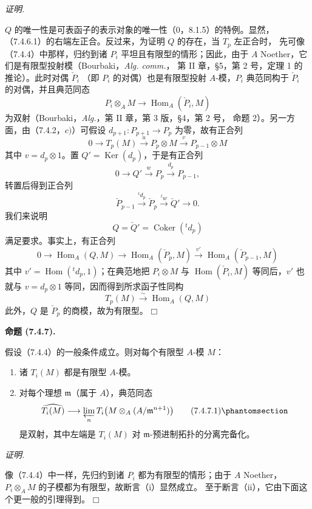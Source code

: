 \documentclass[UTF8,fontset=none,11pt,oneside,openany]{ctexbook}
\providecommand{\square}{\mdlgwhtsquare}
\newenvironment{proposition}[1][]{%
  \par\medskip\noindent\textbf{命题 (#1).}\ %
}{\par}
\newenvironment{proof}{%
  \par\smallskip\noindent\textit{证明.}\ %
}{\hfill$\square$\par}
\newcommand{\oldpage}[2][]{%
  \hypertarget{ega-source-page-#1-#2}{}%
  \marginnote{\scriptsize\textbf{#1}~|~#2}\ignorespaces}
\let\EGAOriginalLabel\label
\renewcommand{\label}[1]{\phantomsection\EGAOriginalLabel{#1}}
\begin{document}
\begin{proof}
$Q$ 的唯一性是可表函子的表示对象的唯一性（0，8.1.5）的特例。显然，
（7.4.6.1）的右端左正合。反过来，为证明 $Q$ 的存在，当 $T_p$ 左正合时，
先可像（7.4.4）中那样，归约到诸 $P_i$ 平坦且有限型的情形；因此，由于
$A$ Noether，它们是有限型投射模（Bourbaki，\emph{Alg. comm.}，
第 II 章，\S 5，第 2 号，定理 1 的推论）。此时对偶 $\check P_i$
（即 $P_i$ 的对偶）也是有限型投射 $A$-模，$P_i$ 典范同构于 $\check P_i$
的对偶，并且典范同态
\[
  P_i\otimes_A M\longrightarrow\operatorname{Hom}_A(\check P_i,M)
\]
为双射（Bourbaki，\emph{Alg.}，第 II 章，第 3 版，\S 4，第 2 号，
命题 2）。另一方面，由（7.4.2，$c)$）可假设
$d_{p+1}:P_{p+1}\to P_p$ 为零，故有正合列
\[
  0\longrightarrow T_p(M)\xrightarrow{u}P_p\otimes M
  \xrightarrow{v}P_{p-1}\otimes M
\]
其中 $v=d_p\otimes1$。置 $Q'=\operatorname{Ker}(d_p)$，于是有正合列
\[
  0\longrightarrow Q'\xrightarrow{w}P_p\xrightarrow{d_p}P_{p-1},
\]
转置后得到正合列
\[
  \check P_{p-1}\xrightarrow{{}^t d_p}\check P_p
  \xrightarrow{{}^t w}\check Q'\longrightarrow0.
\]
我们来说明
\[
  Q=\check Q'=\operatorname{Coker}({}^t d_p)
\]
满足要求。事实上，有正合列
\[
  0\longrightarrow\operatorname{Hom}_A(Q,M)
  \longrightarrow\operatorname{Hom}_A(\check P_p,M)
  \xrightarrow{v'}\operatorname{Hom}_A(\check P_{p-1},M)
\]
\oldpage[III]{189}
其中 $v'=\operatorname{Hom}({}^t d_p,1)$；在典范地把
$P_i\otimes M$ 与 $\operatorname{Hom}(\check P_i,M)$ 等同后，$v'$
也就与 $v=d_p\otimes1$ 等同，因而得到所求函子性同构
\[
  T_p(M)\xrightarrow{\sim}\operatorname{Hom}_A(Q,M)
\]
此外，$Q$ 是 $\check P_p$ 的商模，故为有限型。
\end{proof}

\begin{proposition}[7.4.7]
假设（7.4.4）的一般条件成立。则对每个有限型 $A$-模 $M$：
\begin{enumerate}
  \item[(i)] 诸 $T_i(M)$ 都是有限型 $A$-模。
  \item[(ii)] 对每个理想 $\mathfrak m$（属于 $A$），典范同态
    \[
      \widehat{T_i(M)}
      \longrightarrow
      \varprojlim_n T_i\bigl(M\otimes_A(A/\mathfrak m^{n+1})\bigr)
      \tag{7.4.7.1}\label{III.7.4.7.1.fr}
    \]
    是双射，其中左端是 $T_i(M)$ 对 $\mathfrak m$-预进制拓扑的分离完备化。
\end{enumerate}
\end{proposition}

\begin{proof}
像（7.4.4）中一样，先归约到诸 $P_i$ 都为有限型的情形；由于 $A$
Noether，$P_i\otimes_A M$ 的子模都为有限型，故断言（i）显然成立。
至于断言（ii），它由下面这个更一般的引理得到。
\end{proof}
\end{document}
